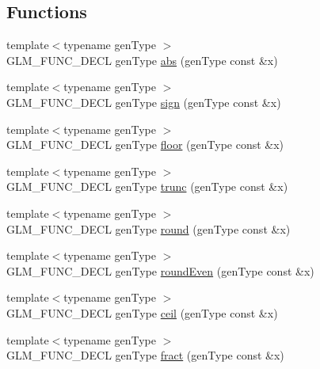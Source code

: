 \subsection*{Functions}
\begin{DoxyCompactItemize}
\item 
{\footnotesize template$<$typename gen\+Type $>$ }\\G\+L\+M\+\_\+\+F\+U\+N\+C\+\_\+\+D\+E\+CL gen\+Type \hyperlink{group__core__func__common_gaea946f96ec1df259802effe9f532e1c1}{abs} (gen\+Type const \&x)
\item 
{\footnotesize template$<$typename gen\+Type $>$ }\\G\+L\+M\+\_\+\+F\+U\+N\+C\+\_\+\+D\+E\+CL gen\+Type \hyperlink{group__core__func__common_gaa7afd59ab947e313d41cb6d9c655a80c}{sign} (gen\+Type const \&x)
\item 
{\footnotesize template$<$typename gen\+Type $>$ }\\G\+L\+M\+\_\+\+F\+U\+N\+C\+\_\+\+D\+E\+CL gen\+Type \hyperlink{group__core__func__common_ga86350252cc9bf86421317460bbd1f21c}{floor} (gen\+Type const \&x)
\item 
{\footnotesize template$<$typename gen\+Type $>$ }\\G\+L\+M\+\_\+\+F\+U\+N\+C\+\_\+\+D\+E\+CL gen\+Type \hyperlink{group__core__func__common_gadb091aed51e45872f6dc841affa41c5c}{trunc} (gen\+Type const \&x)
\item 
{\footnotesize template$<$typename gen\+Type $>$ }\\G\+L\+M\+\_\+\+F\+U\+N\+C\+\_\+\+D\+E\+CL gen\+Type \hyperlink{group__core__func__common_ga75ebab3fe88a9c5c769135cf5a2649ef}{round} (gen\+Type const \&x)
\item 
{\footnotesize template$<$typename gen\+Type $>$ }\\G\+L\+M\+\_\+\+F\+U\+N\+C\+\_\+\+D\+E\+CL gen\+Type \hyperlink{group__core__func__common_ga6535952553479a4bbca7f1f12a011b17}{round\+Even} (gen\+Type const \&x)
\item 
{\footnotesize template$<$typename gen\+Type $>$ }\\G\+L\+M\+\_\+\+F\+U\+N\+C\+\_\+\+D\+E\+CL gen\+Type \hyperlink{group__core__func__common_gab81e02fff55c9391e28fa47e68c3c903}{ceil} (gen\+Type const \&x)
\item 
{\footnotesize template$<$typename gen\+Type $>$ }\\G\+L\+M\+\_\+\+F\+U\+N\+C\+\_\+\+D\+E\+CL gen\+Type \hyperlink{group__core__func__common_gad04ac2908d032d5518d5f6c8403dbc8b}{fract} (gen\+Type const \&x)
\item 

\end{DoxyCompactItemize}
